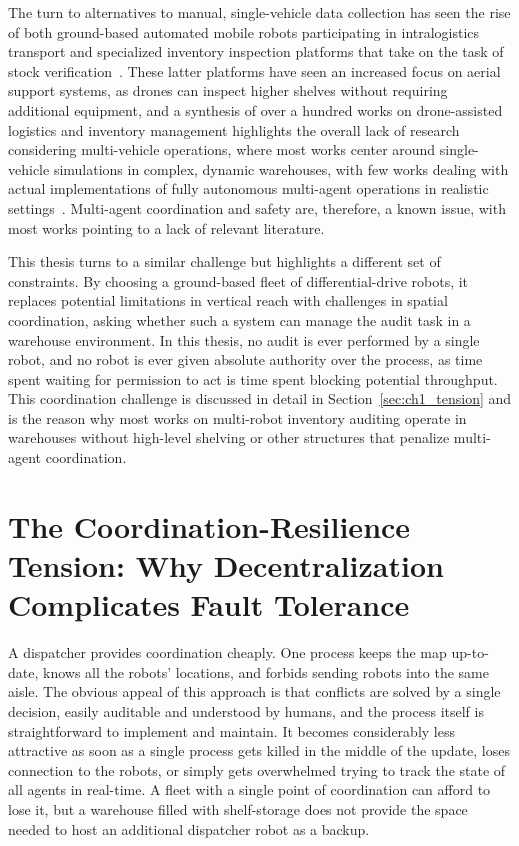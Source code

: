 The turn to alternatives to manual, single-vehicle data collection has seen the rise of both ground-based automated mobile robots participating in intralogistics transport and specialized inventory inspection platforms that take on the task of stock verification~\cite{bernardo2022survey}. These latter platforms have seen an increased focus on aerial support systems, as drones can inspect higher shelves without requiring additional equipment, and a synthesis of over a hundred works on drone-assisted logistics and inventory management highlights the overall lack of research considering multi-vehicle operations, where most works center around single-vehicle simulations in complex, dynamic warehouses, with few works dealing with actual implementations of fully autonomous multi-agent operations in realistic settings~\cite{pore2026drone}. Multi-agent coordination and safety are, therefore, a known issue, with most works pointing to a lack of relevant literature.

This thesis turns to a similar challenge but highlights a different set of constraints. By choosing a ground-based fleet of differential-drive robots, it replaces potential limitations in vertical reach with challenges in spatial coordination, asking whether such a system can manage the audit task in a warehouse environment. In this thesis, no audit is ever performed by a single robot, and no robot is ever given absolute authority over the process, as time spent waiting for permission to act is time spent blocking potential throughput. This coordination challenge is discussed in detail in Section~\ref{sec:ch1_tension} and is the reason why most works on multi-robot inventory auditing operate in warehouses without high-level shelving or other structures that penalize multi-agent coordination.

\section{The Coordination-Resilience Tension: Why Decentralization Complicates Fault Tolerance\label{sec:ch1_tension}}

A dispatcher provides coordination cheaply. One process keeps the map up-to-date, knows all the robots' locations, and forbids sending robots into the same aisle. The obvious appeal of this approach is that conflicts are solved by a single decision, easily auditable and understood by humans, and the process itself is straightforward to implement and maintain. It becomes considerably less attractive as soon as a single process gets killed in the middle of the update, loses connection to the robots, or simply gets overwhelmed trying to track the state of all agents in real-time. A fleet with a single point of coordination can afford to lose it, but a warehouse filled with shelf-storage does not provide the space needed to host an additional dispatcher robot as a backup.

